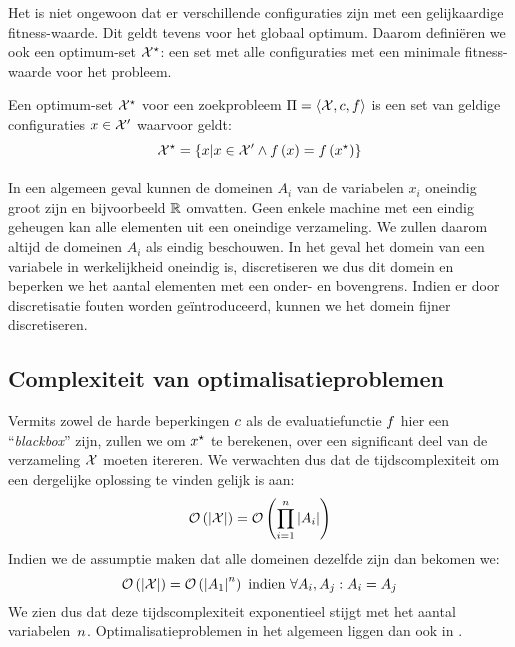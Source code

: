 Het is niet ongewoon dat er verschillende configuraties zijn met een gelijkaardige fitness-waarde. Dit geldt tevens voor het globaal optimum. Daarom defini\"eren we ook een optimum-set $\mathcal{X}^{\star}$: een set met alle configuraties met een minimale fitness-waarde voor het probleem.

\begin{definition}
Een optimum-set $\mathcal{X}^{\star}$ voor een zoekprobleem $\Pi=\left\langle \mathcal{X},c,f\right\rangle$ is een set van geldige configuraties $x\in\mathcal{X}'$ waarvoor geldt:
\begin{equation}
\mathcal{X}^{\star}=\left\{ x|x\in\mathcal{X}'\wedge f\left(x\right)=f\left(x^{\star}\right)\right\}
\end{equation}
\end{definition}

\paragraph{}
In een algemeen geval kunnen de domeinen $A_i$ van de variabelen $x_i$ oneindig groot zijn en bijvoorbeeld $\mathbb{R}$ omvatten. Geen enkele machine met een eindig geheugen kan alle elementen uit een oneindige verzameling. We zullen daarom altijd de domeinen $A_i$ als eindig beschouwen. In het geval het domein van een variabele in werkelijkheid oneindig is, discretiseren we dus dit domein en beperken we het aantal elementen met een onder- en bovengrens. Indien er door discretisatie fouten worden ge\"introduceerd, kunnen we het domein fijner discretiseren.

\subsection{Complexiteit van optimalisatieproblemen}

Vermits zowel de harde beperkingen $c$ als de evaluatiefunctie $f$ hier een ``\emph{blackbox}'' zijn, zullen we om $x^{\star}$ te berekenen, over een significant deel van de verzameling $\mathcal{X}$ moeten itereren. We verwachten dus dat de tijdscomplexiteit om een dergelijke oplossing te vinden gelijk is aan:
\begin{equation}
\mathcal{O}\left(\left| \mathcal{X}\right|\right)=\mathcal{O}\left(\displaystyle\prod_{i=1}^n\left| A_i\right|\right)
\end{equation}
Indien we de assumptie maken dat alle domeinen dezelfde zijn dan bekomen we:
\begin{equation}
\mathcal{O}\left(\left| \mathcal{X}\right|\right)=\mathcal{O}\left(\left| A_1\right|^n\right)\mbox{ indien }\forall A_i,A_j: A_i=A_j
\end{equation}
We zien dus dat deze tijdscomplexiteit exponentieel stijgt met het aantal variabelen~$n$. Optimalisatieproblemen in het algemeen liggen dan ook in .


